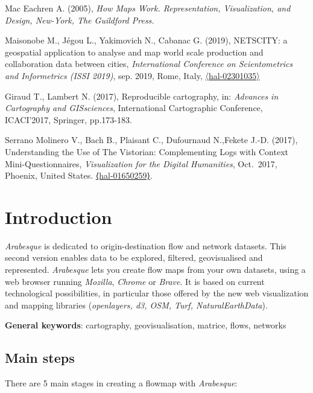 \documentclass[
  letterpaper,
  DIV=11,
  numbers=noendperiod]{scrreprt}
\begin{document}
Mac Eachren A. (2005), \emph{How Maps Work. Representation,
Visualization, and Design, New-York, The Guildford Press.}

Maisonobe M., Jégou L., Yakimovich N., Cabanac G. (2019), NETSCITY: a
geospatial application to analyse and map world scale production and
collaboration data between cities, \emph{International Conference on
Scientometrics and Informetrics (ISSI 2019)}, sep. 2019, Rome, Italy,
\href{https://hal.science/hal-02301035}{〈hal-02301035〉}

Giraud T., Lambert N. (2017), Reproducible cartography, in:
\emph{Advances in Cartography and GISsciences}, International
Cartographic Conference, ICACI'2017, Springer, pp.173-183.

Serrano Molinero V., Bach B., Plaisant C., Dufournaud N.,Fekete J.-D.
(2017), Understanding the Use of The Vistorian: Complementing Logs with
Context Mini-Questionnaires, \emph{Visualization for the Digital
Humanities}, Oct.~2017, Phoenix, United States.
\href{https://inria.hal.science/hal-01650259}{⟨hal-01650259⟩}.


\chapter{Introduction}\label{introduction}

\emph{Arabesque} is dedicated to origin-destination flow and network
datasets. This second version enables data to be explored, filtered,
geovisualised and represented. \emph{Arabesque} lets you create flow
maps from your own datasets, using a web browser running \emph{Mozilla},
\emph{Chrome} or \emph{Brave}. It is based on current technological
possibilities, in particular those offered by the new web visualization
and mapping libraries (\emph{openlayers, d3, OSM, Turf,
NaturalEarthData}).

\textbf{General keywords}: cartography, geovisualisation, matrice,
flows, networks

\section{Main steps}\label{main-steps}

There are 5 main stages in creating a flowmap with \emph{Arabesque}:
\end{document}
